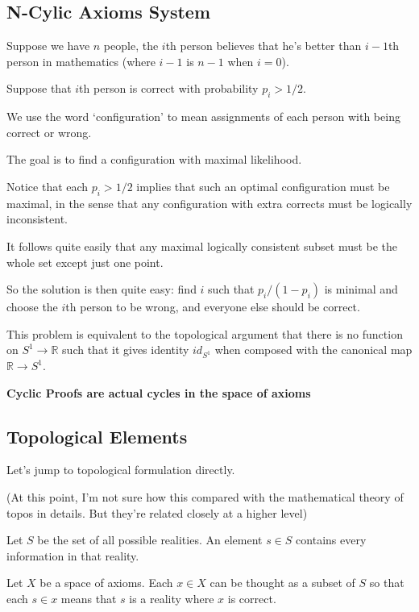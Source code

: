 \documentclass[11pt, oneside]{article}   	%
\theoremstyle{definition}
\begin{document}
\subsection{N-Cylic Axioms System}

Suppose we have $n$ people, the $i$th person believes that he's better than $i-1$th person in mathematics (where $i-1$ is $n-1$ when $i=0$).

Suppose that $i$th person is correct with probability $p_i>1/2$.

We use the word `configuration' to mean assignments of each person with being correct or wrong.

The goal is to find a configuration with maximal likelihood.

Notice that each $p_i>1/2$ implies that such an optimal configuration must be maximal, in the sense that any configuration with extra corrects must be logically inconsistent.

It follows quite easily that any maximal logically consistent subset must be the whole set except just one point.

So the solution is then quite easy: find $i$ such that $p_i/(1-p_i)$ is minimal and choose the $i$th person to be wrong, and everyone else should be correct.

\begin{rmk}
	This problem is equivalent to the topological argument that there is no function on $S^1\to \mathbb{R}$ such that it gives identity $id_{S^1}$ when composed with the canonical map $\mathbb{R}\to S^1$.
\end{rmk}

\begin{rmk}
	\textbf{Cyclic Proofs are actual cycles in the space of axioms}
\end{rmk}

\subsection{Topological Elements}

Let's jump to topological formulation directly.

(At this point, I'm not sure how this compared with the mathematical theory of topos in details. But they're related closely at a higher level)

Let $S$ be the set of all possible realities. An element $s\in S$ contains every information in that reality.

Let $X$ be a space of axioms. Each $x\in X$ can be thought as a subset of $S$ so that each $s\in x$ means that $s$ is a reality where $x$ is correct.
\end{document}
